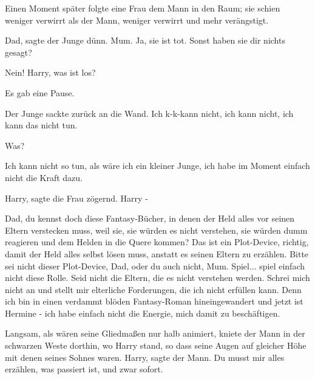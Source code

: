 Einen Moment später folgte eine Frau dem Mann in den Raum; sie schien weniger
verwirrt als der Mann, weniger verwirrt und mehr verängstigt.

\glqq{}Dad\grqq{}, sagte der Junge dünn. \glqq{}Mum. Ja, sie ist tot. Sonst haben
sie dir nichts gesagt?\grqq{}

\glqq{}Nein! Harry, was ist los?\grqq{}

Es gab eine Pause.

Der Junge sackte zurück an die Wand. \glqq{}Ich k-k-kann nicht, ich kann nicht,
ich kann das nicht tun.\grqq{}

\glqq{}Was?\grqq{}

\glqq{}Ich kann nicht so tun, als wäre ich ein kleiner Junge, ich habe im Moment
einfach nicht die Kraft dazu.\grqq{}

\glqq{}Harry\grqq{}, sagte die Frau zögernd. \glqq{}Harry -\grqq{}

\glqq{}Dad, du kennst doch diese Fantasy-Bücher, in denen der Held alles vor
seinen Eltern verstecken muss, weil sie, sie würden es nicht verstehen, sie
würden dumm reagieren und dem Helden in die Quere kommen? Das ist ein
Plot-Device, richtig, damit der Held alles selbst lösen muss, anstatt es seinen
Eltern zu erzählen. Bitte sei nicht dieser Plot-Device, Dad, oder du auch nicht,
Mum. Spiel... spiel einfach nicht diese Rolle. Seid nicht die Eltern, die es
nicht verstehen werden. Schrei mich nicht an und stellt mir elterliche
Forderungen, die ich nicht erfüllen kann. Denn ich bin in einen verdammt blöden
Fantasy-Roman hineingewandert und jetzt ist Hermine - ich habe einfach nicht die
Energie, mich damit zu beschäftigen.\grqq{}

Langsam, als wären seine Gliedmaßen nur halb animiert, kniete der Mann in der
schwarzen Weste dorthin, wo Harry stand, so dass seine Augen auf gleicher Höhe
mit denen seines Sohnes waren. \glqq{}Harry\grqq{}, sagte der Mann. \glqq{}Du
musst mir alles erzählen, was passiert ist, und zwar sofort.\grqq{}

